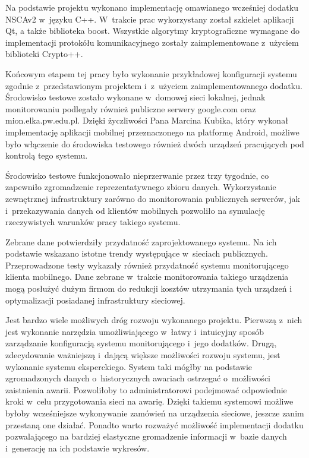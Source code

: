 Na podstawie projektu wykonano implementację omawianego wcześniej
dodatku NSCAv2 w~języku C++. W~trakcie prac wykorzystany został
szkielet aplikacji Qt, a także biblioteka boost. Wszystkie algorytmy
kryptograficzne wymagane do implementacji protokółu komunikacyjnego
zostały zaimplementowane z~użyciem biblioteki Crypto++.

Końcowym etapem tej pracy było wykonanie przykładowej konfiguracji
systemu zgodnie z~przedstawionym projektem i~z~użyciem
zaimplementowanego dodatku. Środowisko testowe zostało wykonane
w~domowej sieci lokalnej, jednak monitorowaniu podlegały również
publiczne serwery google.com oraz mion.elka.pw.edu.pl. Dzięki
życzliwości Pana Marcina Kubika, który wykonał implementację aplikacji
mobilnej przeznaczonego na platformę Android, możliwe było włączenie do
środowiska testowego również dwóch urządzeń pracujących pod kontrolą
tego systemu.

Środowisko testowe funkcjonowało nieprzerwanie przez trzy tygodnie, co
zapewniło zgromadzenie reprezentatywnego zbioru danych. Wykorzystanie
zewnętrznej infrastruktury zarówno do monitorowania publicznych
serwerów, jak i~przekazywania danych od klientów mobilnych pozwoliło na
symulację rzeczywistych warunków pracy takiego systemu.

Zebrane dane potwierdziły przydatność zaprojektowanego systemu. Na ich
podstawie wskazano istotne trendy występujące w~sieciach
publicznych. Przeprowadzone testy wykazały również przydatność systemu
monitorującego klienta mobilnego. Dane zebrane w~trakcie monitorowania
takiego urządzenia mogą posłużyć dużym firmom do redukcji kosztów
utrzymania tych urządzeń i optymalizacji posiadanej infrastruktury
sieciowej.

Jest bardzo wiele możliwych dróg rozwoju wykonanego projektu. Pierwszą
z~nich jest wykonanie narzędzia umożliwiającego w~łatwy i~intuicyjny
sposób zarządzanie konfiguracją systemu monitorującego i~jego
dodatków. Drugą, zdecydowanie ważniejszą i~dającą większe możliwości
rozwoju systemu, jest wykonanie systemu eksperckiego. System taki
mógłby na podstawie zgromadzonych danych o~historycznych awariach
ostrzegać o~możliwości zaistnienia awarii. Pozwoliłoby to
administratorowi podejmować odpowiednie kroki w~celu przygotowania
sieci na awarię. Dzięki takiemu systemowi możliwe byłoby wcześniejsze
wykonywanie zamówień na urządzenia sieciowe, jeszcze zanim przestaną
one działać. Ponadto warto rozważyć możliwość implementacji dodatku
pozwalającego na bardziej elastyczne gromadzenie informacji w~bazie
danych i~generację na ich podstawie wykresów.
